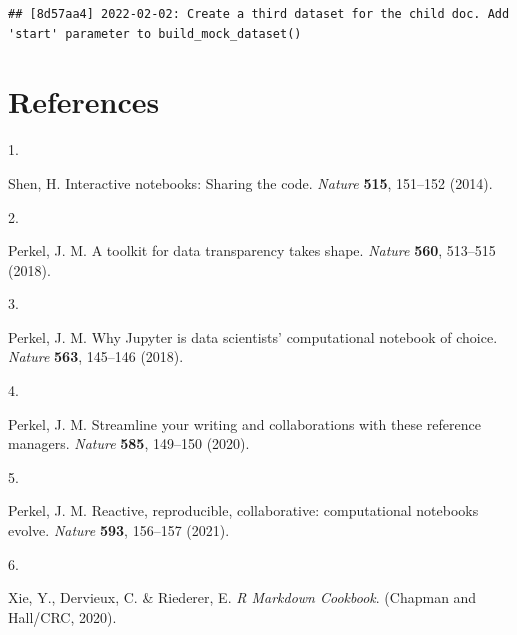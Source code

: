 \documentclass[smallextended]{svjour3}       %
\newlength{\cslhangindent}
\newlength{\csllabelwidth}
\newlength{\cslentryspacingunit} %
\newenvironment{CSLReferences}[2] %
 {%
  \setlength{\parindent}{0pt}
  \ifodd #1
  \let\oldpar\par
  \def\par{\hangindent=\cslhangindent\oldpar}
  \fi
  \setlength{\parskip}{#2\cslentryspacingunit}
 }%
 {}
\newcommand{\CSLLeftMargin}[1]{\parbox[t]{\csllabelwidth}{#1}}
\newcommand{\CSLRightInline}[1]{\parbox[t]{\linewidth - \csllabelwidth}{#1}\break}
\begin{document}
\begin{verbatim}
## [8d57aa4] 2022-02-02: Create a third dataset for the child doc. Add 'start' parameter to build_mock_dataset()
\end{verbatim}

\hypertarget{references}{%
\section*{References}\label{references}}

\hypertarget{refs}{}
\begin{CSLReferences}{0}{0}
\leavevmode\hypertarget{ref-shen2014}{}%
\CSLLeftMargin{1. }
\CSLRightInline{Shen, H. Interactive notebooks: Sharing the code. \emph{Nature} \textbf{515}, 151--152 (2014).}

\leavevmode\hypertarget{ref-perkel2018a}{}%
\CSLLeftMargin{2. }
\CSLRightInline{Perkel, J. M. A toolkit for data transparency takes shape. \emph{Nature} \textbf{560}, 513--515 (2018).}

\leavevmode\hypertarget{ref-perkel2018}{}%
\CSLLeftMargin{3. }
\CSLRightInline{Perkel, J. M. Why Jupyter is data scientists{'} computational notebook of choice. \emph{Nature} \textbf{563}, 145--146 (2018).}

\leavevmode\hypertarget{ref-perkel2020}{}%
\CSLLeftMargin{4. }
\CSLRightInline{Perkel, J. M. Streamline your writing {{}} and collaborations {{}} with these reference managers. \emph{Nature} \textbf{585}, 149--150 (2020).}

\leavevmode\hypertarget{ref-perkel2021}{}%
\CSLLeftMargin{5. }
\CSLRightInline{Perkel, J. M. Reactive, reproducible, collaborative: computational notebooks evolve. \emph{Nature} \textbf{593}, 156--157 (2021).}

\leavevmode\hypertarget{ref-xieMarkdownCookbook2020}{}%
\CSLLeftMargin{6. }
\CSLRightInline{Xie, Y., Dervieux, C. \& Riederer, E. \emph{R {Markdown Cookbook}}. ({Chapman and Hall/CRC}, 2020).}

\end{CSLReferences}




\end{document}

